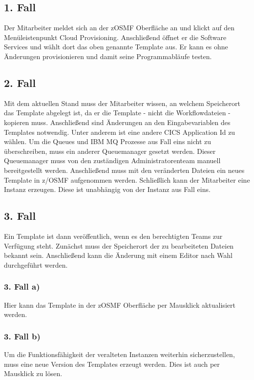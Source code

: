\subsection{1. Fall}
Der Mitarbeiter meldet sich an der zOSMF Oberfläche an und klickt auf den Menüleistenpunkt \glqq Cloud Provisioning\grqq.
Anschließend öffnet er die \glqq Software Services\grqq{} und wählt dort das oben genannte Template aus.
Er kann es ohne Änderungen provisionieren und damit seine Programmabläufe testen.

\subsection{2. Fall}
Mit dem aktuellen Stand muss der Mitarbeiter wissen, an welchem Speicherort das Template abgelegt ist, da er die Template - nicht die Workflowdateien - kopieren muss.
Anschließend sind Änderungen an den Eingabevariablen des Templates notwendig.
Unter anderem ist eine andere CICS Application Id zu wählen.
Um die Queues und IBM MQ Prozesse aus Fall eins nicht zu überschreiben, muss  ein anderer Queuemanager gesetzt werden.
Dieser Queuemanager muss von den zuständigen Administratorenteam manuell bereitgestellt werden.
Anschließend muss mit den veränderten Dateien ein neues Template in z/OSMF aufgenommen werden.
Schließlich kann der Mitarbeiter eine Instanz erzeugen.
Diese ist unabhängig von der Instanz aus Fall eins.

\subsection{3. Fall}
Ein Template ist dann veröffentlich, wenn es den berechtigten Teams zur Verfügung steht.
Zunächst muss der Speicherort der zu bearbeiteten Dateien bekannt sein.
Anschließend kann die Änderung mit einem Editor nach Wahl durchgeführt werden.

\subsubsection{3. Fall a)}
Hier kann das Template in der zOSMF Oberfläche per Mausklick aktualisiert werden.

\subsubsection{3. Fall b)}
Um die Funktionsfähigkeit der veralteten Instanzen weiterhin sicherzustellen, muss eine neue Version des Templates erzeugt werden.
Dies ist auch per Mausklick zu lösen.


